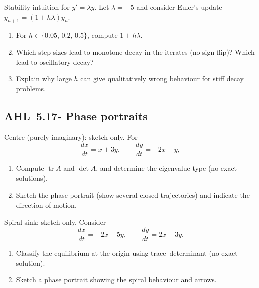 \documentclass[11pt]{article}
\def\textbf#1{#1}%
\newcommand{\tocsubsection}[1]{\subsection{#1}}
\newcounter{question}
\begin{document}
\begin{question}
\textbf{Stability intuition for $y'=\lambda y$.}
Let $\lambda=-5$ and consider Euler’s update $y_{n+1}=(1+h\lambda)y_n$.
\begin{enumerate}
  \item For $h\in\{0.05,\,0.2,\,0.5\}$, compute $1+h\lambda$.
  \item Which step sizes lead to monotone decay in the iterates (no sign flip)? Which lead to oscillatory decay?
  \item Explain why large $h$ can give qualitatively wrong behaviour for stiff decay problems.
\end{enumerate}
\end{question}




\tocsubsection{AHL 5.17- Phase portraits}


\begin{question}
\textbf{Centre (purely imaginary): sketch only.}
For
\[
\frac{dx}{dt}=x+3y,\qquad \frac{dy}{dt}=-2x-y,
\]
\begin{enumerate}
  \item Compute $\operatorname{tr}A$ and $\det A$, and determine the eigenvalue type (no exact solutions).
  \item Sketch the phase portrait (show several closed trajectories) and indicate the direction of motion.
\end{enumerate}
\begin{center}
\end{center}
\end{question}

\begin{question}
\textbf{Spiral sink: sketch only.}
Consider
\[
\frac{dx}{dt}=-2x-5y,\qquad \frac{dy}{dt}=2x-3y.
\]
\begin{enumerate}
  \item Classify the equilibrium at the origin using trace–determinant (no exact solution).
  \item Sketch a phase portrait showing the spiral behaviour and arrows.
\end{enumerate}
\end{question}
\end{document}

